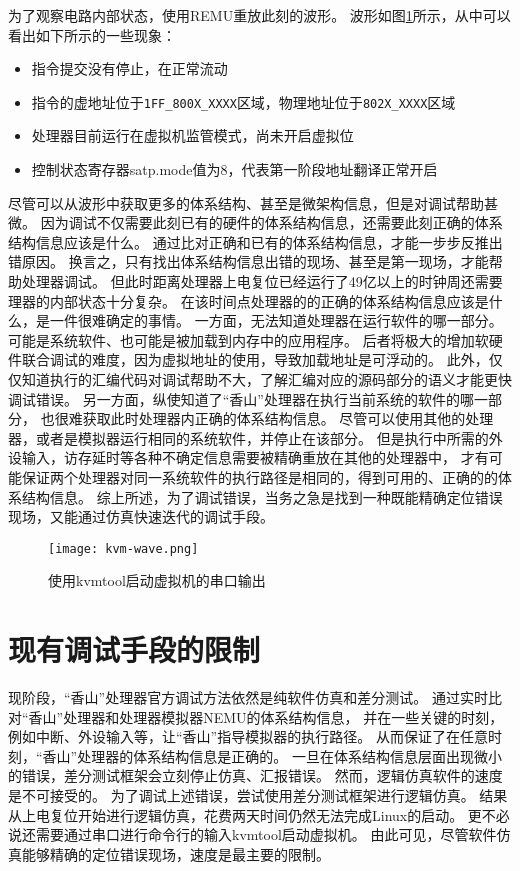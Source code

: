为了观察电路内部状态，使用REMU重放此刻的波形。
波形如图\ref{fig:kvm-wave}所示，从中可以看出如下所示的一些现象：
\begin{itemize}
    \item 指令提交没有停止，在正常流动
    \item 指令的虚地址位于\verb|1FF_800X_XXXX|区域，物理地址位于\verb|802X_XXXX|区域
    \item 处理器目前运行在虚拟机监管模式，尚未开启虚拟位
    \item 控制状态寄存器satp.mode值为8，代表第一阶段地址翻译正常开启
\end{itemize}
尽管可以从波形中获取更多的体系结构、甚至是微架构信息，但是对调试帮助甚微。
因为调试不仅需要此刻已有的硬件的体系结构信息，还需要此刻正确的体系结构信息应该是什么。
通过比对正确和已有的体系结构信息，才能一步步反推出错原因。
换言之，只有找出体系结构信息出错的现场、甚至是第一现场，才能帮助处理器调试。
但此时距离处理器上电复位已经运行了49亿以上的时钟周还需要理器的内部状态十分复杂。
在该时间点处理器的的正确的体系结构信息应该是什么，是一件很难确定的事情。
一方面，无法知道处理器在运行软件的哪一部分。
可能是系统软件、也可能是被加载到内存中的应用程序。
后者将极大的增加软硬件联合调试的难度，因为虚拟地址的使用，导致加载地址是可浮动的。
此外，仅仅知道执行的汇编代码对调试帮助不大，了解汇编对应的源码部分的语义才能更快调试错误。
另一方面，纵使知道了“香山”处理器在执行当前系统的软件的哪一部分，
也很难获取此时处理器内正确的体系结构信息。
尽管可以使用其他的处理器，或者是模拟器运行相同的系统软件，并停止在该部分。
但是执行中所需的外设输入，访存延时等各种不确定信息需要被精确重放在其他的处理器中，
才有可能保证两个处理器对同一系统软件的执行路径是相同的，得到可用的、正确的的体系结构信息。
综上所述，为了调试错误，当务之急是找到一种既能精确定位错误现场，又能通过仿真快速迭代的调试手段。

\begin{figure}[htbp]
    \centering
    \texttt{[image: kvm-wave.png]}
    \caption{使用kvmtool启动虚拟机的串口输出}
    \label{fig:kvm-wave}
\end{figure}

\section{现有调试手段的限制}
现阶段，“香山”处理器官方调试方法依然是纯软件仿真和差分测试。
通过实时比对“香山”处理器和处理器模拟器NEMU的体系结构信息，
并在一些关键的时刻，例如中断、外设输入等，让“香山”指导模拟器的执行路径。
从而保证了在任意时刻，“香山”处理器的体系结构信息是正确的。
一旦在体系结构信息层面出现微小的错误，差分测试框架会立刻停止仿真、汇报错误。
然而，逻辑仿真软件的速度是不可接受的。
为了调试上述错误，尝试使用差分测试框架进行逻辑仿真。
结果从上电复位开始进行逻辑仿真，花费两天时间仍然无法完成Linux的启动。
更不必说还需要通过串口进行命令行的输入kvmtool启动虚拟机。
由此可见，尽管软件仿真能够精确的定位错误现场，速度是最主要的限制。

